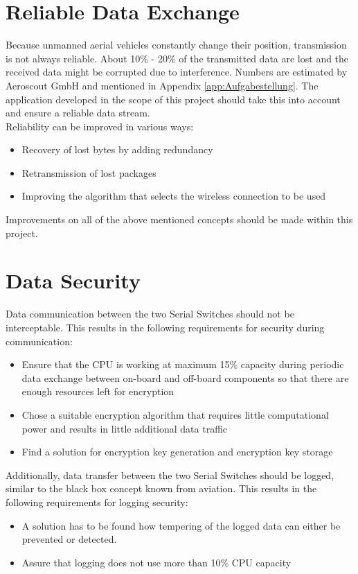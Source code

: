 \section{Reliable Data Exchange}
Because unmanned aerial vehicles constantly change their position, transmission is not always reliable. About 10\% - 20\% of the transmitted data are lost and the received data might be corrupted due to interference. Numbers are estimated by Aeroscout GmbH and mentioned in Appendix \autoref{app:Aufgabestellung}. The application developed in the scope of this project should take this into account and ensure a reliable data stream.\\
Reliability can be improved in various ways: 
\begin{itemize}
    \item Recovery of lost bytes by adding redundancy
    \item Retransmission of lost packages
    \item Improving the algorithm that selects the wireless connection to be used
\end{itemize}
Improvements on all of the above mentioned concepts should be made within this project.
%
%
%
\section{Data Security}
Data communication between the two Serial Switches should not be interceptable. This results in the following requirements for security during communication: \begin{itemize}
    \item Ensure that the CPU is working at maximum 15\% capacity during periodic data exchange between on-board and off-board components so that there are enough resources left for encryption
    \item Chose a suitable encryption algorithm that requires little computational power and results in little additional data traffic
    \item Find a solution for encryption key generation and encryption key storage
\end{itemize}
Additionally, data transfer between the two Serial Switches should be logged, similar to the black box concept known from aviation. This results in the following requirements for logging security: \begin{itemize}
    \item A solution has to be found how tempering of the logged data can either be prevented or detected.
    \item Assure that logging does not use more than 10\% CPU capacity
\end{itemize}